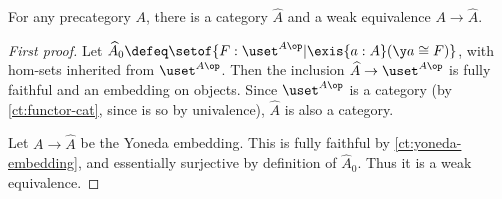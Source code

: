 %
\begin{thm}\label{thm:rezk-completion}
  For any precategory $A$, there is a category $\widehat A$ and a weak equivalence $A\to\widehat{A}$.
\end{thm}

\begin{proof}[First proof]
  Let $\widehat{A}_0 \defeq \setof{ F:\uset^{A\op} | \exis{a:A} (\y a \cong F)}$, with hom-sets inherited from $\uset^{A\op}$.
  Then the inclusion $\widehat{A} \to \uset^{A\op}$ is fully faithful and an embedding on objects.
  Since $\uset^{A\op}$ is a category (by \cref{ct:functor-cat}, since \uset is so by univalence), $\widehat A$ is also a category.

  Let $A\to\widehat A$ be the Yoneda embedding.
  This is fully faithful by \cref{ct:yoneda-embedding}, and essentially surjective by definition of $\widehat{A}_0$.
  Thus it is a weak equivalence.
\end{proof}
